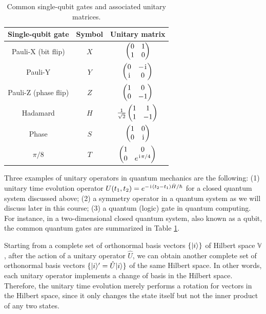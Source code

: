 \begin{table}[t]
\centering
\begin{tabular}{|c|c|c|}
\hline
Single-qubit gate&Symbol&Unitary matrix\\
\hline
Pauli-X (bit flip)&$X$&$\begin{pmatrix}0&1\\1&0\end{pmatrix}$\\
\hline
Pauli-Y&$Y$&$\begin{pmatrix}0&-\hspace{1pt}\mathrm{i}\hspace{1pt}\\ \hspace{1pt}\mathrm{i}\hspace{1pt}&0\end{pmatrix}$\\
\hline
Pauli-Z (phase flip)&$Z$&$\begin{pmatrix}1&0\\0&-1\end{pmatrix}$\\
\hline
Hadamard&$H$&$\frac1{\sqrt2}\begin{pmatrix}1&1\\1&-1\end{pmatrix}$\\
\hline
Phase&$S$&$\begin{pmatrix}1&0\\0&\hspace{1pt}\mathrm{i}\hspace{1pt}\end{pmatrix}$\\
\hline
$\pi/8$&$T$&$\begin{pmatrix}1&0\\0&e^{\hspace{1pt}\mathrm{i}\hspace{1pt}\pi/4}\end{pmatrix}$\\
\hline
\end{tabular}
\caption{Common single-qubit gates and associated unitary matrices.}\label{tab:single qubit gate}
\end{table}

Three examples of unitary operators in quantum mechanics are the following: (1) unitary time evolution operator $U(t_1,t_2)=e^{-\hspace{1pt}\mathrm{i}\hspace{1pt}(t_2-t_1)\hat H/\hbar}$ for a closed quantum system discussed above; (2) a symmetry operator in a quantum system as we will discuss later in this course; (3) a quantum (logic) gate in quantum computing. For instance, in a two-dimensional closed quantum system, also known as a qubit, the common quantum gates are summarized in Table \ref{tab:single qubit gate}.

Starting from a complete set of orthonormal basis vectors $\{|{i}\rangle\}$ of Hilbert space $\mathbb{V}$, after the action of a unitary operator $\hat U$, we can obtain another complete set of orthonormal basis vectors $\{|{i}\rangle^\prime=\hat U|{i}\rangle\}$ of the same Hilbert space. In other words, each unitary operator implements a change of basis in the Hilbert space. Therefore, the unitary time evolution merely performs a rotation for vectors in the Hilbert space, since it only changes the state itself but not the inner product of any two states.  

